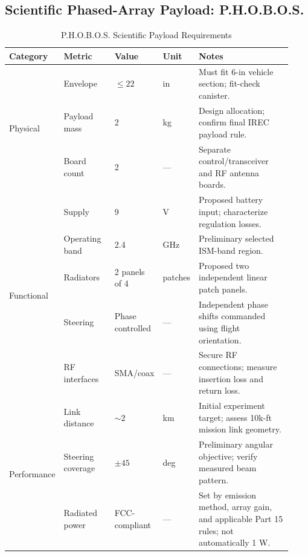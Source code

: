 \documentclass[11pt]{IEEEtran}
\newcommand{\phobos}{P.H.O.B.O.S.}
\begin{document}
\subsection{Scientific Phased-Array Payload: \phobos{}}
\begin{table}[H]
\centering\small
\begin{tabular}{@{}p{0.13\linewidth}p{0.20\linewidth}p{0.13\linewidth}p{0.08\linewidth}p{0.39\linewidth}@{}}
\toprule
\textbf{Category} & \textbf{Metric} & \textbf{Value} & \textbf{Unit} & \textbf{Notes}\\
\midrule
\multirow{3}{*}{Physical}
 & Envelope & $\leq22$ & in & Must fit 6-in vehicle section; fit-check canister.\\ \cmidrule{2-5}
 & Payload mass & 2 & kg & Design allocation; confirm final IREC payload rule.\\ \cmidrule{2-5}
 & Board count & 2 & --- & Separate control/transceiver and RF antenna boards.\\
\midrule
\multirow{5}{*}{Functional}
 & Supply & 9 & V & Proposed battery input; characterize regulation losses.\\ \cmidrule{2-5}
 & Operating band & 2.4 & GHz & Preliminary selected ISM-band region.\\ \cmidrule{2-5}
 & Radiators & 2 panels of 4 & patches & Proposed two independent linear patch panels.\\ \cmidrule{2-5}
 & Steering & Phase controlled & --- & Independent phase shifts commanded using flight orientation.\\ \cmidrule{2-5}
 & RF interfaces & SMA/coax & --- & Secure RF connections; measure insertion loss and return loss.\\
\midrule
\multirow{3}{*}{Performance}
 & Link distance & $\sim2$ & km & Initial experiment target; assess 10k-ft mission link geometry.\\ \cmidrule{2-5}
 & Steering coverage & $\pm45$ & deg & Preliminary angular objective; verify measured beam pattern.\\ \cmidrule{2-5}
 & Radiated power & FCC-compliant & --- & Set by emission method, array gain, and applicable Part 15 rules; not automatically 1 W.\\
\bottomrule
\end{tabular}
\vspace{3mm}
\caption{\phobos{} Scientific Payload Requirements}
\label{tab:PHOBOS_Requirements_Table}
\end{table}
\end{document}
